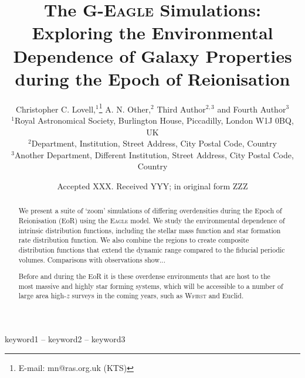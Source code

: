 \documentclass[fleqn,usenatbib]{mnras}
\title[G-Eagle resims]{The \textsc{G-Eagle} Simulations: Exploring the Environmental Dependence of Galaxy Properties during the Epoch of Reionisation}
\author[C. C. Lovell et al.]{
Christopher C. Lovell,$^{1}$\thanks{E-mail: mn@ras.org.uk (KTS)}
A. N. Other,$^{2}$
Third Author$^{2,3}$
and Fourth Author$^{3}$
\\
$^{1}$Royal Astronomical Society, Burlington House, Piccadilly, London W1J 0BQ, UK\\
$^{2}$Department, Institution, Street Address, City Postal Code, Country\\
$^{3}$Another Department, Different Institution, Street Address, City Postal Code, Country
}
\date{Accepted XXX. Received YYY; in original form ZZZ}
\begin{document}
\label{firstpage}
\pagerange{\pageref{firstpage}--\pageref{lastpage}}
\maketitle

\begin{abstract}
We present a suite of `zoom' simulations of differing overdensities during the Epoch of Reionisation (EoR) using the \textsc{Eagle} model.
We study the environmental dependence of intrinsic distribution functions, including the stellar mass function and star formation rate distribution function.
We also combine the regions to create composite distribution functions that extend the dynamic range compared to the fiducial periodic volumes.
Comparisons with observations show...

Before and during the EoR it is these overdense environments that are host to the most massive and highly star forming systems, which will be accessible to a number of large area high-$z$ surveys in the coming years, such as \textsc{Wfirst} and Euclid.
\end{abstract}

\begin{keywords}
keyword1 -- keyword2 -- keyword3
\end{keywords}














\appendix







\bsp	%
\label{lastpage}
\end{document}
